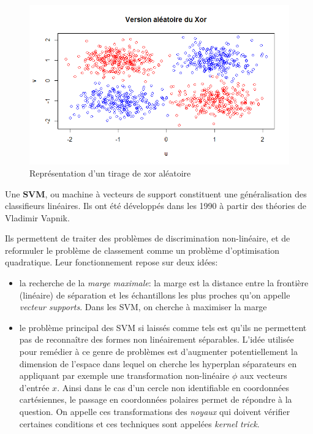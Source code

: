 \documentclass{article}
\begin{document}
\begin{figure}[!h]\centering
\includegraphics[scale=0.6]{xoralea.png}
\caption{Représentation d'un tirage de xor aléatoire}
\label{fig:Neurone}
\end{figure}

\noindent Une \textbf{SVM}, ou machine à vecteurs de support constituent une généralisation des classifieurs linéaires. Ils ont été développés dans les 1990 à partir des théories de Vladimir Vapnik.

\noindent Ils permettent de traiter des problèmes de discrimination non-linéaire, et de reformuler le problème de classement comme un problème d'optimisation quadratique. Leur fonctionnement repose sur deux idées:
\begin{itemize}
\item la recherche de la \textit{marge maximale}: la marge est la distance entre la frontière (linéaire) de séparation et les échantillons les plus proches qu'on appelle \textit{vecteur supports}. Dans les SVM, on cherche à maximiser la marge
\item le problème principal des SVM si laissés comme tels est qu'ils ne permettent pas de reconnaître des formes non linéairement séparables. L'idée utilisée pour remédier à ce genre de problèmes est d'augmenter potentiellement la dimension de l'espace dans lequel on cherche les hyperplan séparateurs en appliquant par exemple une transformation non-linéaire $\phi$ aux vecteurs d'entrée $x$. Ainsi dans le cas d'un cercle non identifiable en coordonnées cartésiennes, le passage en coordonnées polaires permet de répondre à la question. On appelle ces transformations des \textit{noyaux} qui doivent vérifier certaines conditions et ces techniques sont appelées \textit{kernel trick}.
\end{itemize}
\end{document}
